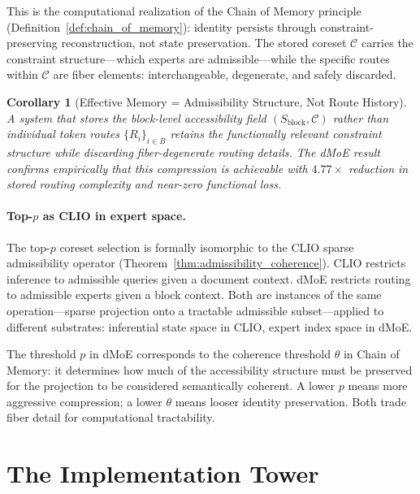 \documentclass[12pt, a4paper, twoside]{article}
\theoremstyle{plain}
\newtheorem{corollary}[theorem]{Corollary}
\theoremstyle{definition}
\theoremstyle{remark}
\begin{document}
This is the computational realization of the Chain of Memory principle
(Definition~\ref{def:chain_of_memory}): identity persists through
constraint-preserving reconstruction, not state preservation. The stored
coreset $\mathcal{C}$ carries the constraint structure---which experts are
admissible---while the specific routes within $\mathcal{C}$ are fiber
elements: interchangeable, degenerate, and safely discarded.

\begin{corollary}[Effective Memory = Admissibility Structure, Not Route History]
\label{cor:mem_admissibility}
A system that stores the block-level accessibility field
$(S_{\mathrm{block}}, \mathcal{C})$ rather than individual token routes
$\{R_i\}_{i \in B}$ retains the functionally relevant constraint structure
while discarding fiber-degenerate routing details. The dMoE result confirms
empirically that this compression is achievable with $4.77\times$ reduction
in stored routing complexity and near-zero functional loss.
\end{corollary}

\paragraph{Top-$p$ as CLIO in expert space.}
The top-$p$ coreset selection is formally isomorphic to the CLIO sparse
admissibility operator (Theorem~\ref{thm:admissibility_coherence}).
CLIO restricts inference to admissible queries given a document context.
dMoE restricts routing to admissible experts given a block context.
Both are instances of the same operation---sparse projection onto a
tractable admissible subset---applied to different substrates: inferential
state space in CLIO, expert index space in dMoE.

The threshold $p$ in dMoE corresponds to the coherence threshold $\theta$
in Chain of Memory: it determines how much of the accessibility structure
must be preserved for the projection to be considered semantically coherent.
A lower $p$ means more aggressive compression; a lower $\theta$ means
looser identity preservation. Both trade fiber detail for computational
tractability.


\section{The Implementation Tower}
\label{sec:implementation_hierarchy}
\end{document}
